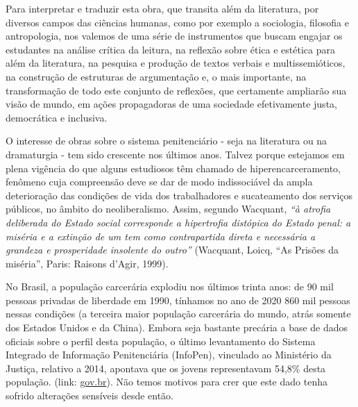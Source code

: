 \documentclass[11pt]{extarticle}
\begin{document}
Para interpretar e traduzir esta obra, que transita além da literatura,
por diversos campos das ciências humanas, como por exemplo a sociologia,
filosofia e antropologia, nos valemos de uma série de instrumentos que
buscam engajar os estudantes na análise crítica da leitura, na reflexão
sobre ética e estética para além da literatura, na pesquisa e produção
de textos verbais e multissemióticos, na construção de estruturas de
argumentação e, o mais importante, na transformação de todo este
conjunto de reflexões, que certamente ampliarão sua visão de mundo, em
ações propagadoras de uma sociedade efetivamente justa, democrática e
inclusiva.

O interesse de obras sobre o sistema penitenciário - seja na literatura
ou na dramaturgia - tem sido crescente nos últimos anos. Talvez porque
estejamos em plena vigência do que alguns estudiosos têm chamado de
hiperencarceramento, fenômeno cuja compreensão deve se dar de modo
indissociável da ampla deterioração das condições de vida dos
trabalhadores e sucateamento dos serviços públicos, no âmbito do
neoliberalismo. Assim, segundo Wacquant, \emph{``à atrofia deliberada do
Estado social corresponde a hipertrofia distópica do Estado penal: a
miséria e a extinção de um tem como contrapartida direta e necessária a
grandeza e prosperidade insolente do outro''} (Wacquant, Loicq, ``As
Prisões da miséria'', Paris: Raisons d'Agir, 1999).

No Brasil, a população carcerária explodiu nos últimos trinta anos: de
90 mil pessoas privadas de liberdade em 1990, tínhamos no ano de 2020
860 mil pessoas nessas condições (a terceira maior população carcerária
do mundo, atrás somente dos Estados Unidos e da China). Embora seja
bastante precária a base de dados oficiais sobre o perfil desta
população, o último levantamento do Sistema Integrado de Informação
Penitenciária (InfoPen), vinculado ao Ministério da Justiça, relativo a
2014, apontava que os jovens representavam 54,8\% desta população.
(link: 
\href{https://www.gov.br/mdh/pt-br/noticias\_seppir/noticias/junho/mapa-do-encarceramento-aponta-maioria-da-populacao-carceraria-e-negra-1}{gov.br}).
Não temos motivos para crer que este dado tenha sofrido alterações
sensíveis desde então.

\end{document}

